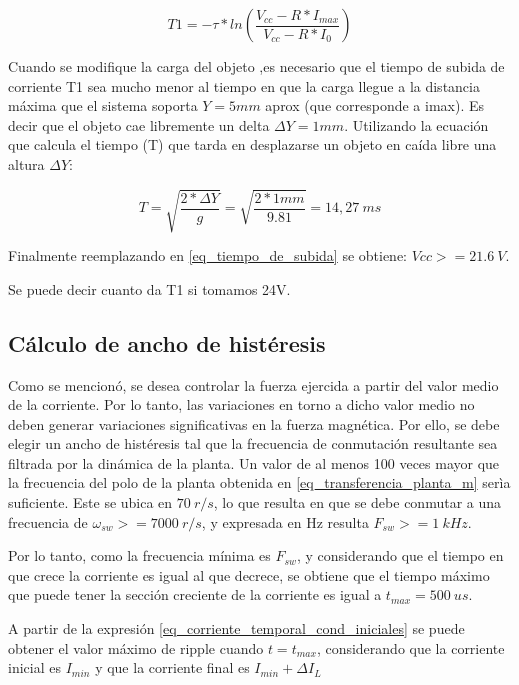 \begin{equation}\label{eq_tiempo_de_subida}
	T1=-\tau*ln(\frac{V_{cc}-R*I_{max}}{V_{cc}-R*I_{0}})
\end{equation}

Cuando se modifique la carga del objeto ,es necesario que el tiempo de subida de corriente T1 sea mucho menor al tiempo en que la carga llegue a la distancia máxima que el sistema soporta $Y=5mm$ aprox (que corresponde a imax). Es decir que el objeto cae libremente un delta $\Delta Y= 1mm $. Utilizando la ecuación que calcula el tiempo (T) que tarda en desplazarse un objeto en caída libre una altura $\Delta Y$:

\begin{equation}
	T=\sqrt{\frac{2*\Delta Y}{g}}=\sqrt{\frac{2*1mm}{9.81}}=14,27\:ms
\end{equation}

Finalmente reemplazando en \ref{eq_tiempo_de_subida} se obtiene: $Vcc>=21.6\:V$.

Se puede decir cuanto da T1 si tomamos 24V.

\subsection{Cálculo de ancho de histéresis}

Como se mencionó, se desea controlar la fuerza ejercida a partir del valor medio de la corriente. Por lo tanto, las variaciones en torno a dicho valor medio no deben generar variaciones significativas en la fuerza magnética. Por ello, se debe elegir un ancho de histéresis tal que la frecuencia de conmutación resultante sea filtrada por la dinámica de la planta. Un valor de al menos 100 veces mayor que la frecuencia del polo de la planta obtenida en \ref{eq_transferencia_planta_m} serìa suficiente. Este se ubica en $70\:r/s$, lo que resulta en que se debe conmutar a una frecuencia de $\omega_{sw}>=7000\:r/s$, y expresada en Hz resulta $F_{sw}>=1\:kHz$.


Por lo tanto, como la frecuencia mínima es $F_{sw}$, y considerando que el tiempo en que crece la corriente es igual al que decrece, se obtiene que el tiempo máximo que puede tener la sección creciente de la corriente es igual a $t_{max}=500\:us$. 

A partir de la expresión \ref{eq_corriente_temporal_cond_iniciales} se puede obtener el valor máximo de ripple cuando $t=t_{max}$, considerando que la corriente inicial es $I_{min}$ y que la corriente final es $I_{min}+\Delta I_L$

